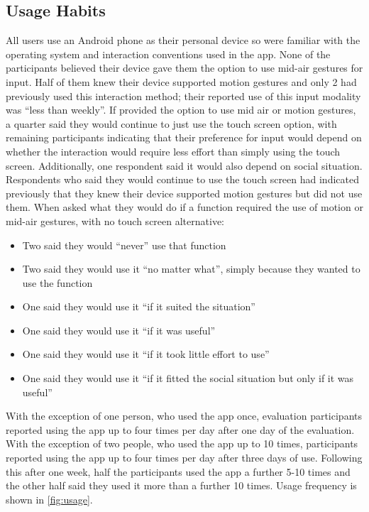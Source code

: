 \documentclass{l4proj}
\begin{document}
\subsection{Usage Habits}

All users use an Android phone as their personal device so were familiar with the operating system and interaction conventions used in the app. None of the participants believed their device gave them the option to use mid-air gestures for input. Half of them knew their device supported motion gestures and only 2 had previously used this interaction method; their reported use of this input modality was ``less than weekly''. If provided the option to use mid air or motion gestures, a quarter said they would continue to just use the touch screen option, with remaining participants indicating that their preference for input would depend on whether the interaction would require less effort than simply using the touch screen. Additionally, one respondent said it would also depend on social situation. Respondents who said they would continue to use the touch screen had indicated previously that they knew their device supported motion gestures but did not use them. When asked what they would do if a function required the use of motion or mid-air gestures, with no touch screen alternative:
\begin{itemize}
    \item Two said they would ``never'' use that function
    \item Two said they would use it ``no matter what'', simply because they wanted to use the function
    \item One said they would use it ``if it suited the situation''
    \item One said they would use it ``if it was useful''
    \item One said they would use it ``if it took little effort to use''
    \item One said they would use it ``if it fitted the social situation but only if it was useful''
\end{itemize}

With the exception of one person, who used the app once, evaluation participants reported using the app up to four times per day after one day of the evaluation. With the exception of two people, who used the app up to 10 times, participants reported using the app up to four times per day after three days of use. Following this after one week, half the participants used the app a further 5-10 times and the other half said they used it more than a further 10 times. Usage frequency is shown in \autoref{fig:usage}.
\end{document}
